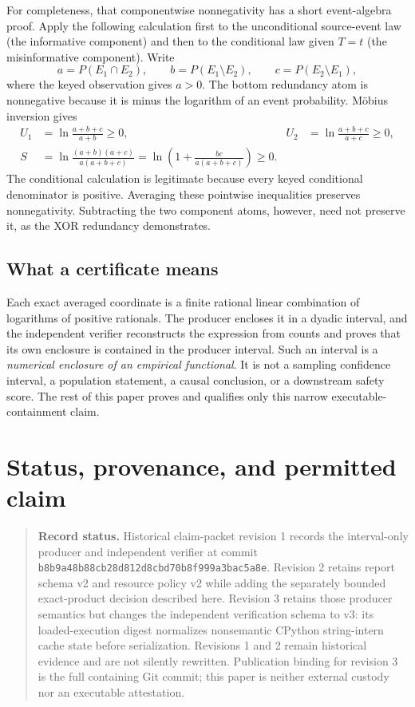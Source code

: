 \documentclass[11pt]{article}
\theoremstyle{definition}
\begin{document}
For completeness, that componentwise nonnegativity has a short event-algebra proof.  Apply the
following calculation first to the unconditional source-event law (the informative component) and
then to the conditional law given \(T=t\) (the misinformative component).  Write
\[
  a=P(E_1\cap E_2),\qquad
  b=P(E_1\setminus E_2),\qquad
  c=P(E_2\setminus E_1),
\]
where the keyed observation gives \(a>0\).  The bottom redundancy atom is nonnegative because it is
minus the logarithm of an event probability.  M{\"o}bius inversion gives
\begin{align}
  U_1&=\ln\frac{a+b+c}{a+b}\ge0,&
  U_2&=\ln\frac{a+b+c}{a+c}\ge0,\\
  S&=\ln\frac{(a+b)(a+c)}{a(a+b+c)}
    =\ln\left(1+\frac{bc}{a(a+b+c)}\right)\ge0.
\end{align}
The conditional calculation is legitimate because every keyed conditional denominator is
positive.  Averaging these pointwise inequalities preserves nonnegativity.  Subtracting the two
component atoms, however, need not preserve it, as the XOR redundancy demonstrates.

\subsection{What a certificate means}

Each exact averaged coordinate is a finite rational linear combination of logarithms of positive
rationals.  The producer encloses it in a dyadic interval, and the independent verifier reconstructs
the expression from counts and proves that its own enclosure is contained in the producer interval.
Such an interval is a \emph{numerical enclosure of an empirical functional}.  It is not a sampling
confidence interval, a population statement, a causal conclusion, or a downstream safety score.
The rest of this paper proves and qualifies only this narrow executable-containment claim.

\section{Status, provenance, and permitted claim}

\begin{quote}
\textbf{Record status.} Historical claim-packet revision 1 records the interval-only producer and
independent verifier at commit \texttt{b8b9a48b88cb28d812d8cbd70b8f999a3bac5a8e}.  Revision 2
retains report schema v2 and resource policy v2 while adding the separately bounded exact-product
decision described here.  Revision 3 retains those producer semantics but changes the independent
verification schema to v3: its loaded-execution digest normalizes nonsemantic CPython string-intern
cache state before serialization.  Revisions 1 and 2 remain historical evidence and are not
silently rewritten.  Publication binding for revision 3 is the full containing Git commit; this
paper is neither external custody nor an executable attestation.
\end{quote}
\end{document}
